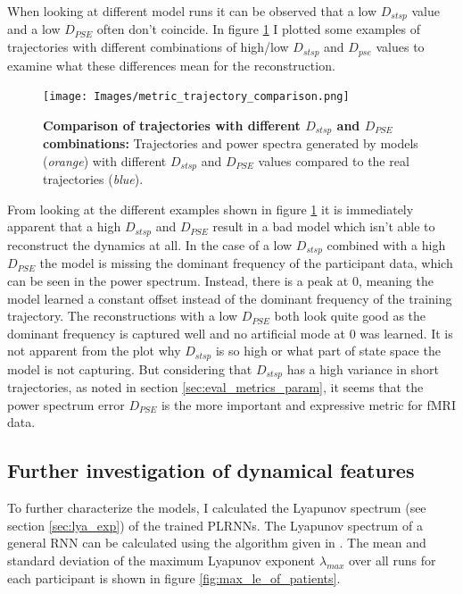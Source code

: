 When looking at different model runs it can be observed that a low $D_{stsp}$ value and a low $D_{PSE}$ often don't coincide.
In figure \ref{fig:metric_trajectory_comparison} I plotted some examples of trajectories with different combinations of high/low $D_{stsp}$ and $D_{pse}$ values to examine 
what these differences mean for the reconstruction.

\begin{figure}
    \texttt{[image: Images/metric\_trajectory\_comparison.png]}
    \caption[Comparison of trajectories with different $D_{stsp}$ and $D_{PSE}$ combinations]
    {\textbf{Comparison of trajectories with different $D_{stsp}$ and $D_{PSE}$ combinations: } Trajectories and power spectra generated by models (\textit{orange}) with different 
    $D_{stsp}$ and $D_{PSE}$ values compared to the real trajectories (\textit{blue}).}
    \label{fig:metric_trajectory_comparison}
\end{figure}

From looking at the different examples shown in figure \ref{fig:metric_trajectory_comparison} it is immediately apparent that a high $D_{stsp}$ and $D_{PSE}$ result in 
a bad model which isn't able to reconstruct the dynamics at all. In the case of a low $D_{stsp}$ combined with a high $D_{PSE}$ the model is missing the dominant 
frequency of the participant data, which can be seen in the power spectrum. Instead, there is a peak at 0, meaning the model learned a constant offset instead of the 
dominant frequency of the training trajectory. The reconstructions with a low $D_{PSE}$ both look quite good as the dominant frequency is captured well and no artificial 
mode at 0 was learned. It is not apparent from the plot why $D_{stsp}$ is so high or what part of state space the model is not capturing. But considering that $D_{stsp}$ has 
a high variance in short trajectories, as noted in section \ref{sec:eval_metrics_param}, it seems that the power spectrum error $D_{PSE}$ is the more important and 
expressive metric for fMRI data.

\FloatBarrier
\subsection{Further investigation of dynamical features}

To further characterize the models, I calculated the Lyapunov spectrum (see section \ref{sec:lya_exp}) of the trained PLRNNs. The Lyapunov spectrum of a general RNN
can be calculated using the algorithm given in \cite{vogt2022lyapunov}. The mean and standard deviation of the maximum Lyapunov exponent $\lambda_{max}$ over all runs for 
each participant is shown in figure \ref{fig:max_le_of_patients}.

